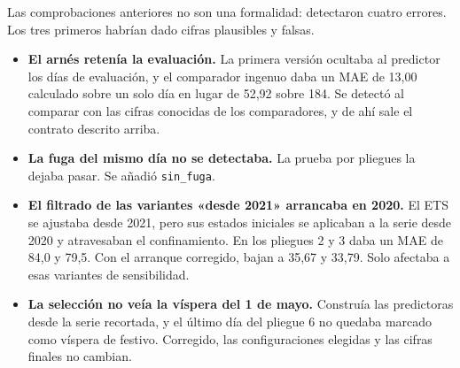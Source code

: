 Las comprobaciones anteriores no son una formalidad: detectaron cuatro errores. Los tres primeros habrían dado cifras plausibles y falsas.
\begin{itemize}
  \item \textbf{El arnés retenía la evaluación.} La primera versión ocultaba al predictor los días de evaluación, y el comparador ingenuo daba un MAE de 13,00 calculado sobre un solo día en lugar de 52,92 sobre 184. Se detectó al comparar con las cifras conocidas de los comparadores, y de ahí sale el contrato descrito arriba.
  \item \textbf{La fuga del mismo día no se detectaba.} La prueba por pliegues la dejaba pasar. Se añadió \texttt{sin\_fuga}.
  \item \textbf{El filtrado de las variantes «desde 2021» arrancaba en 2020.} El ETS se ajustaba desde 2021, pero sus estados iniciales se aplicaban a la serie desde 2020 y atravesaban el confinamiento. En los pliegues 2 y 3 daba un MAE de 84,0 y 79,5. Con el arranque corregido, bajan a 35,67 y 33,79. Solo afectaba a esas variantes de sensibilidad.
  \item \textbf{La selección no veía la víspera del 1 de mayo.} Construía las predictoras desde la serie recortada, y el último día del pliegue 6 no quedaba marcado como víspera de festivo. Corregido, las configuraciones elegidas y las cifras finales no cambian.
\end{itemize}
